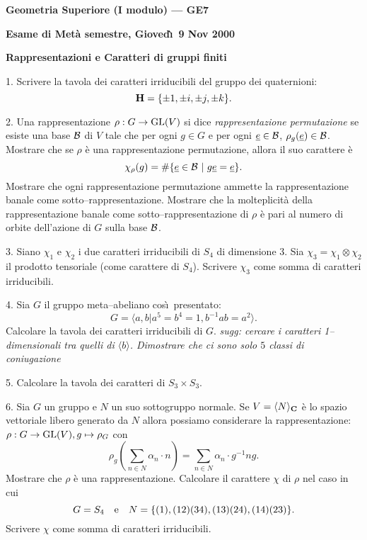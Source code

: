 \nopagenumbers
\centerline{\bf Geometria Superiore (I modulo) --- GE7}
\centerline{\bf Esame di Met\`a semestre, Gioved\`{\i}\ 9 Nov 2000}
\centerline{\bf Rappresentazioni e Caratteri di gruppi finiti}
\rm\bigskip

\item{1.} Scrivere la tavola dei caratteri irriducibili del gruppo dei quaternioni:
$${\bf H}=\{ \pm 1,\pm i, \pm j, \pm k\}.$$
\item{2.} Una rappresentazione $\rho: G \rightarrow {\rm GL}(V)$
si dice {\it rappresentazione permutazione} se esiste una base
$\cal B$ di $V$ tale che per ogni $g\in G$ e per ogni $\underline{e}\in
\cal B$, $\rho_g(\underline{e})\in \cal B$.
 Mostrare che se $\rho$ \`e una rappresentazione permutazione,
allora il suo carattere \`{e}
$$\chi_\rho(g)=\#\{\underline{e}\in {\cal B}\ |\ g\underline{e}=\underline{e}\}.$$
 Mostrare che ogni {rappresentazione permutazione} ammette
la rappresentazione banale come sotto--rap\-pre\-sen\-ta\-zio\-ne.
 Mostrare che la molteplicit\`{a} della rappresentazione
banale come sotto--rap\-pre\-sen\-ta\-zio\-ne di $\rho$ \`e pari al numero di orbite
dell'azione di $G$ sulla base $\cal B$.
\item{3.} Siano $\chi_1$ e $\chi_2$ i due caratteri irriducibili di $S_4$ di
dimensione 3. Sia
$\chi_3=\chi_1\otimes \chi_2$ il prodotto tensoriale (come
carattere di $S_4$). Scrivere $\chi_3$ come somma di caratteri
irriducibili.
\item{4.} Sia $G$ il gruppo meta--abeliano cos\`\i\ presentato:
$$G=\langle a,b | a^5=b^4=1, b^{-1}ab=a^2\rangle.$$
Calcolare la tavola dei caratteri irriducibili di $G$. {\it sugg: cercare i caratteri
1--di\-men\-sio\-na\-li tra quelli di $\langle b\rangle$. Dimostrare che ci sono solo
$5$ classi di coniugazione}
\item{5.} Calcolare la tavola dei caratteri di $S_3\times S_3$.
\item{6.} Sia $G$ un gruppo e $N$ un suo sottogruppo normale. 
Se $V=\langle N\rangle_{\bf C}$ \`e lo spazio vettoriale libero
generato da $N$ allora possiamo considerare la rappresentazione:
$\rho:G\rightarrow {\rm GL}(V), g\mapsto \rho_G$ con
$$\rho_g(\sum_{n\in N}\alpha_n\cdot n)=\sum_{n\in N}\alpha_n\cdot g^{-1}ng.$$
 Mostrare che $\rho$ \`{e} una rappresentazione.
 Calcolare il carattere $\chi$ di $\rho$ nel caso in
cui 
$$G=S_4\ \ \ {\rm e}\ \ \  N=\{(1),(12)(34),(13)(24),(14)(23)\}.$$
 Scrivere $\chi$ come somma di caratteri irriducibili.
